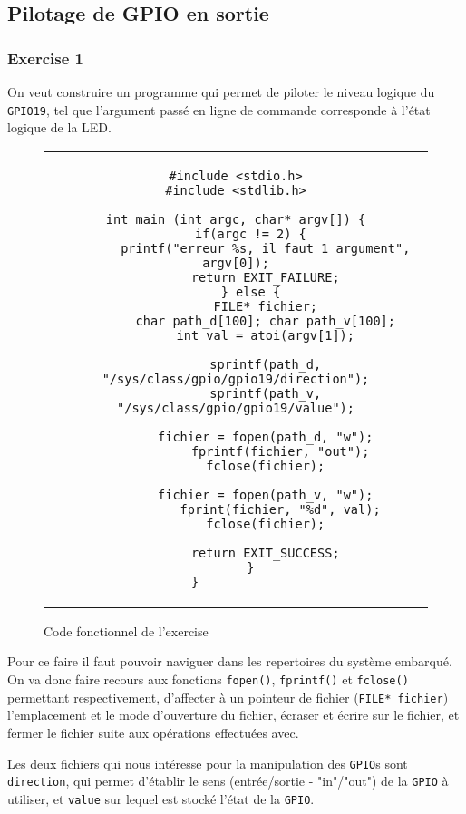 \documentclass[11pt, openright]{book}
\begin{document}
\subsection{Pilotage de GPIO en sortie}

\subsubsection{Exercise 1}

On veut construire un programme qui permet de piloter le niveau logique du \texttt{GPIO19}, tel que l'argument passé en ligne de commande corresponde à l'état logique de la LED.

\begin{figure}[ht!]
	\centering
	\begin{tabular}{c}
		\begin{lstlisting}
#include <stdio.h>
#include <stdlib.h>

int main (int argc, char* argv[]) {
    if(argc != 2) {
        printf("erreur %s, il faut 1 argument", argv[0]);
        return EXIT_FAILURE;
    } else {
        FILE* fichier;
        char path_d[100]; char path_v[100];
        int val = atoi(argv[1]);
        
        sprintf(path_d, "/sys/class/gpio/gpio19/direction");
        sprintf(path_v, "/sys/class/gpio/gpio19/value");

        fichier = fopen(path_d, "w");
            fprintf(fichier, "out");
        fclose(fichier);

        fichier = fopen(path_v, "w");
            fprint(fichier, "%d", val);
        fclose(fichier);

		return EXIT_SUCCESS;
    }
}			\end{lstlisting}
	\end{tabular}
	\caption{Code fonctionnel de l'exercise }
\end{figure}

Pour ce faire il faut pouvoir naviguer dans les repertoires du système embarqué. On va donc faire recours aux fonctions \texttt{fopen()}, \texttt{fprintf()} et \texttt{fclose()} permettant respectivement, d'affecter à un pointeur de fichier (\texttt{FILE* fichier}) l'emplacement et le mode d'ouverture du fichier, écraser et écrire sur le fichier, et fermer le fichier suite aux opérations effectuées avec.

Les deux fichiers qui nous intéresse pour la manipulation des \texttt{GPIO}s sont \texttt{direction}, qui permet d'établir le sens (entrée/sortie - "in"/"out") de la \texttt{GPIO} à utiliser, et \texttt{value} sur lequel est stocké l'état de la \texttt{GPIO}.
\end{document}
